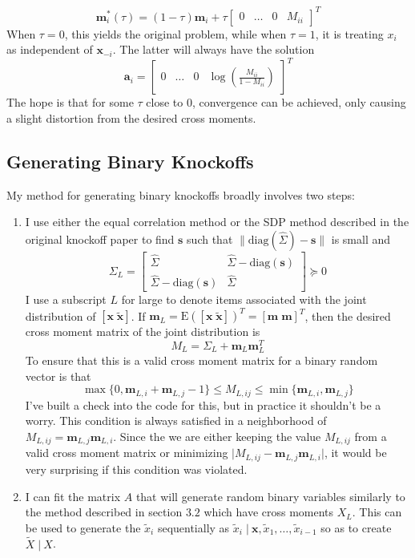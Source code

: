 \documentclass[11pt]{article}
\newcommand{\E}{\mathrm{E}}
\newcommand{\diag}{\mathrm{diag}}
\newcommand{\st}{ \; \big | \:}
\theoremstyle{definition}
\begin{document}
\begin{enumerate}
    \[\mathbf m_i^*(\tau) = (1-\tau)\mathbf m_i + \tau \left[ \begin{array}{cccc} 0 & \ldots & 0 & M_{ii} \end{array} \right]^T \]
            When $\tau=0$, this yields the original problem, while when $\tau=1$, it is treating $x_i$ as independent of $\mathbf x_{-i}$. The latter will always have the solution
            \[\mathbf a_i = \left[ \begin{array}{cccc} 0 & \ldots & 0 & \log\left(\frac{M_{ii}}{1-M_{ii}}\right) \end{array} \right]^T \]
            The hope is that for some $\tau$ close to $0$, convergence can be achieved, only causing a slight distortion from the desired cross moments.
    \end{enumerate}

\subsection{Generating Binary Knockoffs}
    My method for generating binary knockoffs broadly involves two steps:
    \begin{enumerate}
        \item I use either the equal correlation method or the SDP method described in the original knockoff paper to find $\mathbf s$ such that $\|\diag(\hat\Sigma)-\mathbf s\|$ is small and 
        \[ \Sigma_L = \left[\begin{array}{cc}  \hat\Sigma & \hat\Sigma - \diag(\mathbf s )\\ \hat\Sigma - \diag(\mathbf s) & \hat\Sigma \end{array}\right] \succeq 0 \]
        I use a subscript $L$ for large to denote items associated with the joint distribution of $[\mathbf x \; \mathbf{\tilde x}]$. If $\mathbf m_L = \E\left([\mathbf x \; \mathbf{\tilde x}]\right)^T = [\mathbf m \; \mathbf m]^T$, then the desired cross moment matrix of the joint distribution is 
        \[ M_L = \Sigma_L + \mathbf m_L\mathbf m_L^T\]
        To ensure that this is a valid cross moment matrix for a binary random vector is that 
        \[\max\{0,\mathbf m_{L,i} + \mathbf m_{L,j} -1\} \leq M_{L,ij} \leq \min\{\mathbf m_{L,i}, \mathbf m_{L,j}\} \]
        I've built a check into the code for this, but in practice it shouldn't be a worry. This condition is always satisfied in a neighborhood of $M_{L,ij} = \mathbf m_{L,j}\mathbf m_{L,i}$. Since the we are either keeping the value $M_{L,ij}$ from a valid cross moment matrix or minimizing $\vert M_{L,ij} - \mathbf m_{L,j}\mathbf m_{L,i}\vert$, it would be very surprising if this condition was violated.
        
        \item I can fit the matrix $A$ that will generate random binary variables similarly to the method described in section $3.2$ which have cross moments $X_L$. This can be used to generate the $\tilde x_i$ sequentially as $\tilde x_i \st \mathbf x,\tilde x_1,\ldots,\tilde x_{i-1}$ so as to create $\tilde X \st X$. 
    \end{enumerate}
\end{document}
